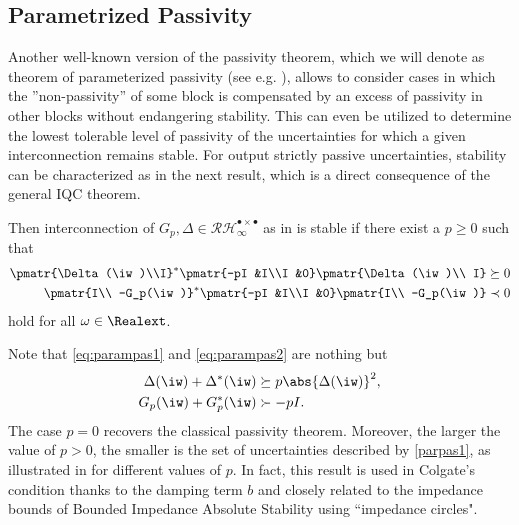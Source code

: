 \subsection{Parametrized Passivity}\label{sec:osppass}
Another well-known version of the passivity theorem, which we will denote as theorem of parameterized passivity (see e.g. \cite[Thm. VI.5.10]{desvid}), allows to consider cases in which the ''non-passivity'' of some block is compensated by an excess of passivity in other blocks without endangering stability. This can even be utilized to determine the lowest tolerable level of passivity of the uncertainties for which a given interconnection remains stable. For output strictly passive uncertainties, stability can be characterized as in the next result, which is a direct consequence of the general IQC theorem.

\begin{coroll}\label{thm:desvidpass} Then interconnection of $G_p,\Delta\in \mathcal{RH}^{\bullet \times \bullet}_\infty$ as in  is stable
if there exist a ${p\geq 0}$ such that
\begin{align}
\pmatr{\Delta(\iw)\\I}^*\pmatr{-pI &I\\I &0}\pmatr{\Delta(\iw)\\ I} &\succeq 0 \label{eq:parampas1}\\
\pmatr{I\\ -G_p(\iw)}^*\pmatr{-pI &I\\I &0}\pmatr{I\\ -G_p(\iw)} &\prec 0 \label{eq:parampas2}
\end{align} hold for all $\omega\in\Realext$.
\end{coroll}

\begin{rem}Note that \eqref{eq:parampas1} and \eqref{eq:parampas2} are nothing but
\begin{align}
	\Delta(\iw) + \Delta^*(\iw) &\succeq {p\abs{\Delta(\iw)}^2,}\label{parpas1}\\
	G_p(\iw) + G_p^*(\iw) &\succ -pI.\label{parpas2}
\end{align}
The case $p=0$ recovers the classical passivity theorem. Moreover, the larger the value of $p>0$, the smaller is the set of uncertainties described by \eqref{parpas1}, as illustrated in  for different values of $p$. In fact, this result is used in Colgate's condition thanks to the damping term $b$ and closely related to the impedance bounds of Bounded Impedance Absolute Stability \cite{haddadizaad} using ``impedance circles".
\end{rem}

